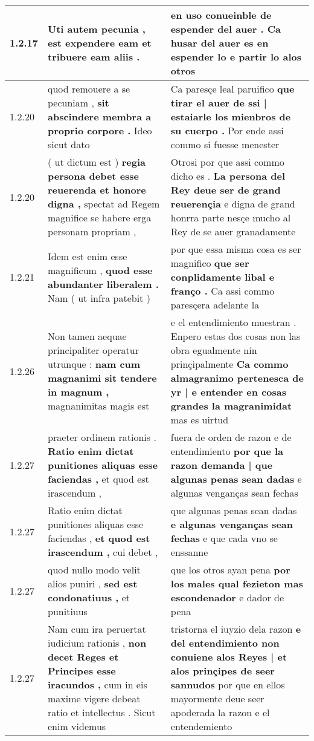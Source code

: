 \begin{tabular}{|p{1cm}|p{6.5cm}|p{6.5cm}|}
1.2.17 & Uti autem pecunia , \textbf{ est expendere eam } et tribuere eam aliis . & en uso conueinble de espender del auer . \textbf{ Ca husar del auer es en espender lo } e partir lo alos otros \\\hline
1.2.20 & quod remouere a se pecuniam , \textbf{ sit abscindere membra a proprio corpore . } Ideo sicut dato & Ca paresçe leal paruifico \textbf{ que tirar el auer de ssi | estaiarle los mienbros de su cuerpo . } Por ende assi commo si fuesse menester \\\hline
1.2.20 & ( ut dictum est ) \textbf{ regia persona debet esse reuerenda et honore digna , } spectat ad Regem magnifice se habere erga personam propriam , & Otrosi por que assi commo dicho es . \textbf{ La persona del Rey deue ser de grand reuerençia } e digna de grand honrra parte nesçe mucho al Rey de se auer granadamente \\\hline
1.2.21 & Idem est enim esse magnificum , \textbf{ quod esse abundanter liberalem . } Nam ( ut infra patebit ) & por que essa misma cosa es ser magnifico \textbf{ que ser conplidamente libal e franço . } Ca assi commo paresçera adelante la \\\hline
1.2.26 & Non tamen aequae principaliter operatur utrunque : \textbf{ nam cum magnanimi sit tendere in magnum , } magnanimitas magis est & e el entendimiento muestran . Enpero estas dos cosas non las obra egualmente nin prinçipalmente \textbf{ Ca commo almagranimo pertenesca de yr | e entender en cosas grandes la magranimidat } mas es uirtud \\\hline
1.2.27 & praeter ordinem rationis . \textbf{ Ratio enim dictat punitiones aliquas esse faciendas , } et quod est irascendum , & fuera de orden de razon e de entendimiento \textbf{ por que la razon demanda | que algunas penas sean dadas } e algunas venganças sean fechas \\\hline
1.2.27 & Ratio enim dictat punitiones aliquas esse faciendas , \textbf{ et quod est irascendum , } cui debet , & que algunas penas sean dadas \textbf{ e algunas venganças sean fechas } e que cada vno se enssanne \\\hline
1.2.27 & quod nullo modo velit alios puniri , \textbf{ sed est condonatiuus , } et punitiuus & que los otros ayan pena \textbf{ por los males qual fezieton mas escondenador } e dador de pena \\\hline
1.2.27 & Nam cum ira peruertat iudicium rationis , \textbf{ non decet Reges et Principes esse iracundos , } cum in eis maxime vigere debeat ratio et intellectus . Sicut enim videmus & tristorna el iuyzio dela razon \textbf{ e del entendimiento non conuiene alos Reyes | et alos prinçipes de seer sannudos } por que en ellos mayormente deue seer apoderada la razon e el entendemiento \\\hline

\end{tabular}
